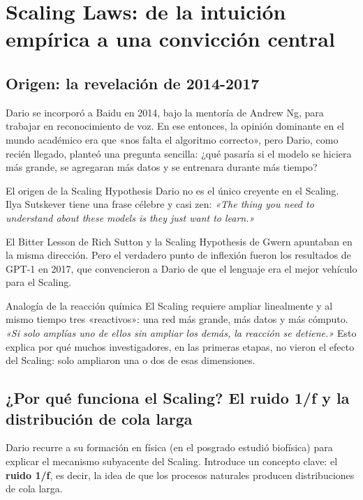 \section{Scaling Laws: de la intuición empírica a una convicción central}

\subsection{Origen: la revelación de 2014-2017}

Dario se incorporó a Baidu en 2014, bajo la mentoría de Andrew Ng, para trabajar en reconocimiento de voz. En ese entonces, la opinión dominante en el mundo académico era que «nos falta el algoritmo correcto», pero Dario, como recién llegado, planteó una pregunta sencilla: ¿qué pasaría si el modelo se hiciera más grande, se agregaran más datos y se entrenara durante más tiempo?

\begin{knowledgebox}{El origen de la Scaling Hypothesis}
Dario no es el único creyente en el Scaling. Ilya Sutskever tiene una frase célebre y casi zen: \textit{«The thing you need to understand about these models is they just want to learn.»}

El Bitter Lesson de Rich Sutton y la Scaling Hypothesis de Gwern apuntaban en la misma dirección. Pero el verdadero punto de inflexión fueron los resultados de GPT-1 en 2017, que convencieron a Dario de que el lenguaje era el mejor vehículo para el Scaling.
\end{knowledgebox}

\begin{importantbox}{Analogía de la reacción química}
El Scaling requiere ampliar linealmente y al mismo tiempo tres «reactivos»: una red más grande, más datos y más cómputo. \textit{«Si solo amplías uno de ellos sin ampliar los demás, la reacción se detiene.»} Esto explica por qué muchos investigadores, en las primeras etapas, no vieron el efecto del Scaling: solo ampliaron una o dos de esas dimensiones.
\end{importantbox}

\subsection{¿Por qué funciona el Scaling? El ruido 1/f y la distribución de cola larga}

Dario recurre a su formación en física (en el posgrado estudió biofísica) para explicar el mecanismo subyacente del Scaling. Introduce un concepto clave: el \textbf{ruido 1/f}, es decir, la idea de que los procesos naturales producen distribuciones de cola larga.


